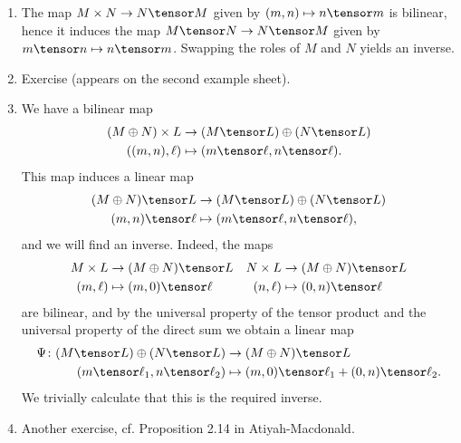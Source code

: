 \begin{enumerate}[label=(\roman*)]
	\item The map $M\times N\to N\tensor M$ given by
		$(m, n)\mapsto n \tensor m$ is bilinear, hence it induces the map
		$M\tensor N\to N\tensor M$ given by $m\tensor n\mapsto n\tensor m$.
		Swapping the roles of $M$ and $N$ yields an inverse.
	\item Exercise (appears on the second example sheet).
	\item We have a bilinear map
		\begin{align*}
			(M\oplus N)\times L&\to (M\tensor L)\oplus(N\tensor L)\\
			((m, n), \ell)&\mapsto (m\tensor \ell, n\tensor \ell).
		\end{align*}
		This map induces a linear map
		\begin{align*}
			(M\oplus N)\tensor L&\to (M\tensor L)\oplus (N\tensor L)\\
			(m, n)\tensor \ell&\mapsto (m\tensor\ell, n\tensor\ell),
		\end{align*}
		and we will find an inverse. Indeed, the maps
		\begin{align*}
			M\times L&\to (M\oplus N)\tensor L & N\times L&\to (M\oplus N)\tensor L\\
			(m, \ell) &\mapsto (m, 0) \tensor \ell & (n, \ell) &\mapsto (0, n)\tensor\ell
		\end{align*}
		are bilinear, and by the universal property of the tensor product and
		the universal property of the direct sum we obtain a linear map
		\begin{align*}
			\Psi\colon (M\tensor L)\oplus (N\tensor L)&\to (M\oplus N)\tensor L\\
			(m\tensor \ell_1, n\tensor \ell_2)&\mapsto (m, 0)\tensor\ell_1 + (0, n)\tensor\ell_2.
		\end{align*}
		We trivially calculate that this is the required inverse.
	\item Another exercise, cf. Proposition 2.14 in Atiyah-Macdonald.
\end{enumerate}
